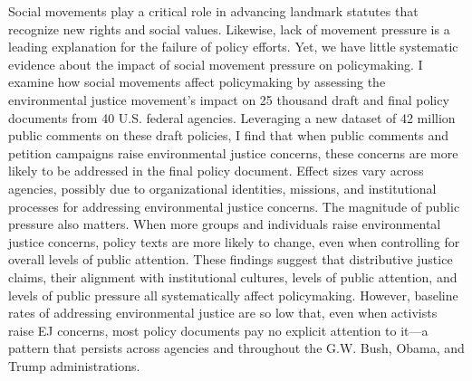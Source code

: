Social movements play a critical role in advancing landmark statutes that recognize new rights and social values. Likewise, lack of movement pressure is a leading explanation for the failure of policy efforts. Yet, we have little systematic evidence about the impact of social movement pressure on policymaking. I examine how social movements affect policymaking by assessing the environmental justice movement's impact on 25 thousand draft and final policy documents from 40 U.S. federal agencies. Leveraging a new dataset of 42 million public comments on these draft policies, I find that when public comments and petition campaigns raise environmental justice concerns, these concerns are more likely to be addressed in the final policy document. Effect sizes vary across agencies, possibly due to organizational identities, missions, and institutional processes for addressing environmental justice concerns. The magnitude of public pressure also matters. When more groups and individuals raise environmental justice concerns, policy texts are more likely to change, even when controlling for overall levels of public attention. These findings suggest that distributive justice claims, their alignment with institutional cultures, levels of public attention, and levels of public pressure all systematically affect policymaking. However, baseline rates of addressing environmental justice are so low that, even when activists raise EJ concerns, most policy documents pay no explicit attention to it---a pattern that persists across agencies and throughout the G.W. Bush, Obama, and Trump administrations.